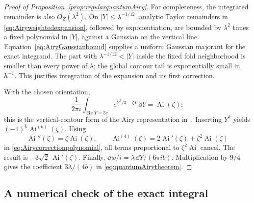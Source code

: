 \begin{proof}[Proof of Proposition~\ref{prop:regularquantumAiry}]
For completeness, the integrated remainder is also
$O_Z(\lambda^2)$. On
$|Y|\le\lambda^{-1/12}$, analytic Taylor remainders in
\eqref{eq:Airyweightedexpansion}, followed by exponentiation,
are bounded by $\lambda^2$ times a fixed polynomial in
$|Y|$, against a Gaussian on the vertical line.
Equation~\eqref{eq:AiryGaussianbound} supplies a uniform
Gaussian majorant for the exact integrand. The part with
$\lambda^{-1/12}<|Y|$ inside the fixed fold neighborhood
is smaller than every power of $\lambda$; the global contour
tail is exponentially small in $h^{-1}$. This justifies
integration of the expansion and its first correction.

With the chosen orientation,
\[
 \frac1{2\pi i}\int_{\operatorname{Re}Y=3c}
       e^{Y^3/3-\zeta Y}\,\dd Y=\operatorname{Ai}(\zeta);
\]
this is the vertical-contour form of the Airy representation
in~\cite[Section~9.5]{DLMF}. Inserting $Y^k$ yields
$(-1)^k\operatorname{Ai}^{(k)}(\zeta)$.
Using
\[
 \operatorname{Ai}''(\zeta)=\zeta\operatorname{Ai}(\zeta),
 \qquad
 \operatorname{Ai}^{(4)}(\zeta)
       =2\operatorname{Ai}'(\zeta)
          +\zeta^2\operatorname{Ai}(\zeta)
\]
in \eqref{eq:Airycorrectionpolynomial}, all terms proportional
to $\zeta^2\operatorname{Ai}$ cancel. The result is
$-3\sqrt2\,\operatorname{Ai}'(\zeta)$.
Finally,
$\dd w/i=\lambda\,\dd Y/(6\pi i b)$.
Multiplication by $9/4$ gives the coefficient
$3\lambda/(4b)$ in \eqref{eq:quantumAirytheorem}.
\end{proof}

\subsection{A numerical check of the exact integral}

